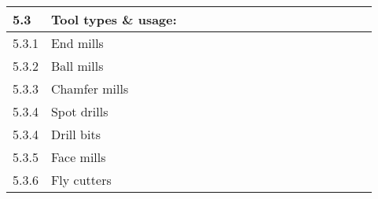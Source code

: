 \documentclass[a5paper]{article}
\begin{document}
\begin{tabularx}{\textwidth}{|l|X|c|c|c|c|c|c|c|c|c|c|c|c|c|c|c|}
    5.3 & Tool types \& usage:
    & \multicolumn{15}{c|}{} \\ \hline
    5.3.1 & \hspace{5mm} End mills
    & & & & & & & & & & & & & & & \\ \hline
    5.3.2 & \hspace{5mm} Ball mills
    & & & & & & & & & & & & & & & \\ \hline
    5.3.3 & \hspace{5mm} Chamfer mills
    & & & & & & & & & & & & & & & \\ \hline
    5.3.4 & \hspace{5mm} Spot drills
    & & & & & & & & & & & & & & & \\ \hline
    5.3.4 & \hspace{5mm} Drill bits
    & & & & & & & & & & & & & & & \\ \hline
    5.3.5 & \hspace{5mm} Face mills
    & & & & & & & & & & & & & & & \\ \hline
    5.3.6 & \hspace{5mm} Fly cutters
    & & & & & & & & & & & & & & & \\ \hline
\end{tabularx}
\end{document}
